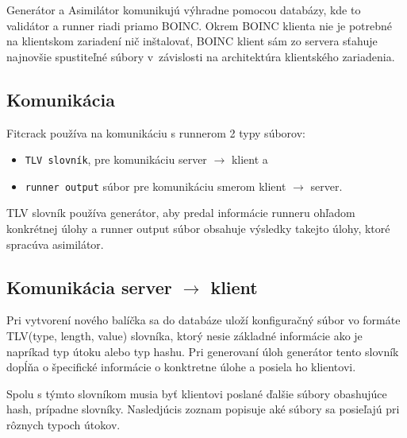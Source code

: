 Generátor a Asimilátor komunikujú výhradne pomocou databázy, kde to validátor a runner riadi priamo BOINC.
Okrem BOINC klienta nie je potrebné na klientskom zariadení nič inštalovať, BOINC klient sám zo servera sťahuje najnovšie spustiteľné súbory v~závislosti na architektúra klientského zariadenia.

\subsection{Komunikácia}
Fitcrack používa na komunikáciu s runnerom 2 typy súborov:
\begin{itemize}
	\item \texttt{TLV slovník}, pre komunikáciu server $\rightarrow$ klient a
	\item \texttt{runner output} súbor pre komunikáciu smerom klient $\rightarrow$ server.
\end{itemize}
TLV slovník používa generátor, aby predal informácie runneru ohľadom konkrétnej úlohy a runner output súbor obsahuje výsledky takejto úlohy, ktoré spracúva asimilátor.

\subsection*{Komunikácia server $\rightarrow$ klient}
\label{from_server}
Pri vytvorení nového balíčka sa do databáze uloží konfiguračný súbor vo formáte TLV(type, length, value) slovníka, ktorý nesie základné informácie ako je napríkad typ útoku alebo typ hashu.
Pri generovaní úloh generátor tento slovník dopĺňa o špecifické informácie o konktretne úlohe a posiela ho klientovi.

Spolu s týmto slovníkom musia byť klientovi poslané ďalšie súbory obashujúce hash, prípadne slovníky.
Nasledjúcis zoznam popisuje aké súbory sa posieľajú pri rôznych typoch útokov.

